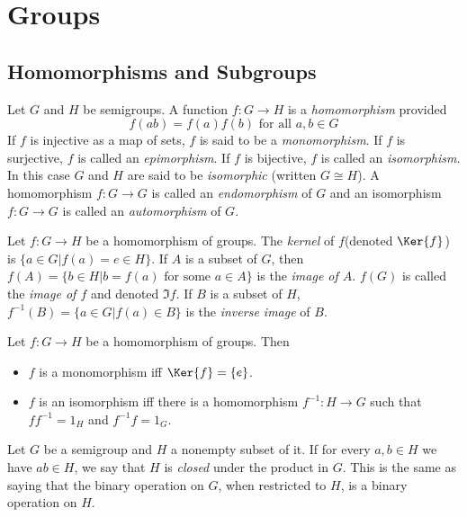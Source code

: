\chapter{Groups}






\section{Homomorphisms and Subgroups}
\begin{Definition}
	Let $ G $ and $ H $ be semigroups. A function $ f:G \to H $ is a \textit{homomorphism} provided
	\begin{equation}
		f(ab)=f(a)f(b) \text{ for all }a,b \in G\nonumber
	\end{equation}
	If $ f $ is injective as a map of sets, $ f $ is said to be a \textit{monomorphism}. If $ f $ is surjective, $ f $ is called an \textit{epimorphism}. If $ f $ is bijective, $ f $ is called an \textit{isomorphism}. In this case $ G $ and $ H $ are said to be \textit{isomorphic} (written $ G \cong H $). A homomorphism $ f:G \to G $ is called an \textit{endomorphism} of $ G $ and an isomorphism $ f:G \to G $ is called an \textit{automorphism} of $ G $.
\end{Definition}
\begin{Definition}
	Let $ f:G \to H $ be a homomorphism of groups. The \textit{kernel} of $ f $(denoted $ \Ker{f} $) is $ \{a\in G | f(a) = e \in H  \} $. If $ A $ is a subset of $ G $, then $ f(A)=\{b \in H | b= f(a) \text{ for some }a \in A \} $  is the \textit{image of $ A $}. $ f(G) $ is called the \textit{image of $ f $} and denoted $ \Im{f} $. If $ B $ is a subset of $ H $, $ f^{-1}(B)=\{a \in G |f(a) \in B  \} $ is the \textit{inverse image} of $ B $.
\end{Definition}
\begin{Theorem}
	Let $ f:G \to H $ be a homomorphism of groups. Then
	\begin{itemize}
		\item $ f $ is a monomorphism iff $ \Ker{f}=\{e\} $.
		\item $ f $ is an isomorphism iff there is a homomorphism $ f^{-1}:H \to G $ such that $ f f^{-1}=1_H $ and $ f^{-1}f=1_G $.
	\end{itemize}
\end{Theorem}
\begin{Definition}
	Let $ G $ be a semigroup and $ H $ a nonempty subset of it. If for every $ a,b \in H $ we have $ ab \in H $, we say that $ H $ is \textit{closed} under the product in $ G $. This is the same as saying that the binary operation on $ G $, when restricted to $ H $, is a binary operation on $ H $.
\end{Definition}
